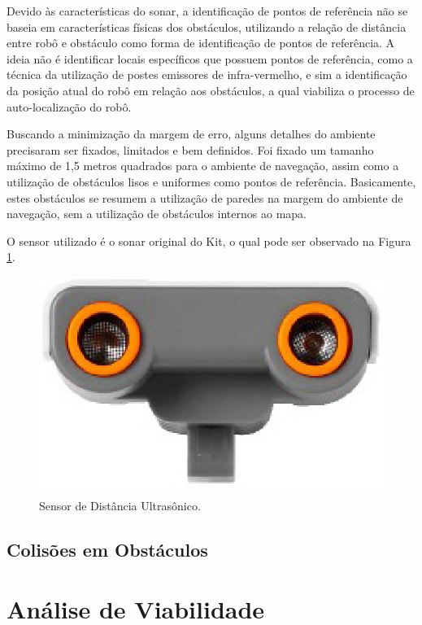   Devido às características do sonar, a identificação de pontos de referência não se baseia em características físicas dos obstáculos,
  utilizando a relação de distância entre robô e obstáculo como forma de identificação de pontos de referência. A ideia não é
  identificar locais específicos que possuem pontos de referência, como a técnica da utilização de postes emissores de infra-vermelho,
  e sim a identificação da posição atual do robô em relação aos obstáculos, a qual viabiliza o processo de auto-localização do robô.

  Buscando a minimização da margem de erro, alguns detalhes do ambiente precisaram ser fixados, limitados e bem definidos. Foi fixado
  um tamanho máximo de 1,5 metros quadrados para o ambiente de navegação, assim como a utilização de obstáculos lisos e uniformes como
  pontos de referência. Basicamente, estes obstáculos se resumem a utilização de paredes na margem do ambiente de navegação, sem a utilização
  de obstáculos internos ao mapa.

  O sensor utilizado é o sonar original do Kit, o qual pode ser observado na Figura \ref{img:sonar_utilizado}.

  \begin{figure}[H]
    \centering
    \includegraphics[scale=0.5]{figuras/ultrasonic.eps}
    \caption{Sensor de Distância Ultrasônico.}
    \label{img:sonar_utilizado}
  \end{figure}


\subsection{Colisões em Obstáculos}
\label{sub:colisao}

\section{Análise de Viabilidade}
\label{sec:viabilidade}
